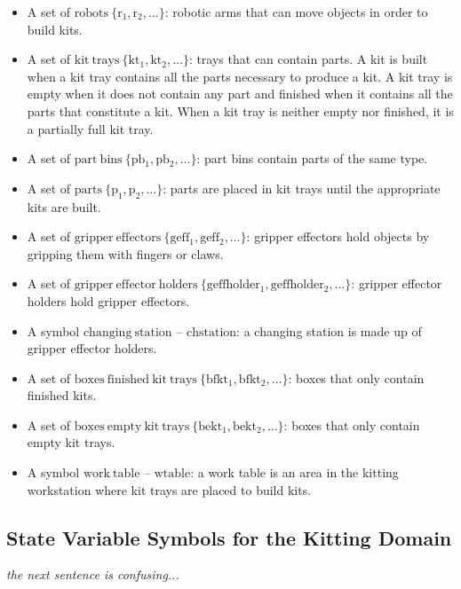 \begin{small}
\begin{itemize}
\item A set of $\mathrm{robots\ \lbrace r_1, r_2,\dots \rbrace}$: robotic arms that can move objects in order to build kits.

\item A set of $\mathrm{kit\ trays\ \lbrace kt_1, kt_2,\dots \rbrace}$: trays that can contain parts. A kit is built when a kit tray contains all the parts necessary to produce a kit. A kit tray is empty when it does not contain any part and finished when it contains all the parts that constitute a kit. When a kit tray is neither empty nor finished, it is a partially full kit tray.

\item A set of $\mathrm{part\ bins\ \lbrace pb_1, pb_2,\dots \rbrace}$: part bins contain parts of the same type.

\item A set of $\mathrm{parts\ \lbrace p_1, p_2,\dots \rbrace}$: parts are placed in kit trays until the appropriate kits are built. 
\item A set of $\mathrm{gripper\ effectors\ \lbrace geff_1, geff_2,\dots \rbrace}$: gripper effectors hold objects by gripping them with fingers or claws.

\item A set of $\mathrm{gripper\ effector\ holders\ \lbrace geffholder_1, geffholder_2,\dots \rbrace}$: gripper effector holders hold gripper effectors.

\item A symbol $\mathrm{changing\ station}$ -- $\mathrm{chstation}$: a changing station is made up of gripper effector holders.

\item A set of $\mathrm{boxes\ finished\ kit\ trays\ \lbrace bfkt_1, bfkt_2,\dots \rbrace}$: boxes that only contain finished kits.

\item A set of $\mathrm{boxes\ empty\ kit\ trays\ \lbrace bekt_1, bekt_2,\dots \rbrace}$: boxes that only contain empty kit trays.

\item A symbol $\mathrm{work\ table}$ -- $\mathrm{wtable}$: a work table is an area in the kitting workstation where kit trays are placed to build kits.
\end{itemize}
\end {small}
\subsection{State Variable Symbols for the Kitting Domain}
{\it the next sentence is confusing...}

